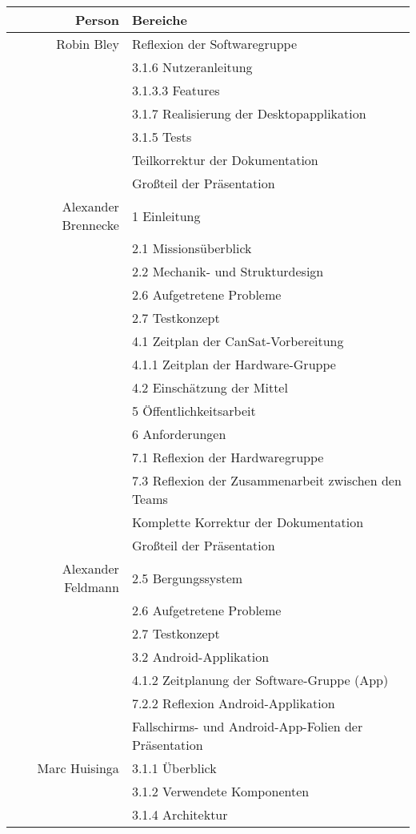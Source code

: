 \begin{table}[H]
	\centering
	\begin{tabular}{rl}
		\toprule
		\textbf{Person} & \textbf{Bereiche} \\
		\midrule
		Robin Bley & Reflexion der Softwaregruppe \\
		 & 3.1.6 Nutzeranleitung \\
		 & 3.1.3.3 Features \\
		 & 3.1.7 Realisierung der Desktopapplikation \\
		 & 3.1.5 Tests \\
		 & Teilkorrektur der Dokumentation \\
		 & Großteil der Präsentation \\
		Alexander Brennecke & 1 Einleitung  \\
		& 2.1 Missionsüberblick \\
		& 2.2 Mechanik- und Strukturdesign \\
		& 2.6 Aufgetretene Probleme \\
		& 2.7 Testkonzept \\
		& 4.1 Zeitplan der CanSat-Vorbereitung \\
		& 4.1.1 Zeitplan der Hardware-Gruppe \\
		& 4.2 Einschätzung der Mittel \\
		& 5 Öffentlichkeitsarbeit \\
		& 6 Anforderungen \\
		& 7.1 Reflexion der Hardwaregruppe \\
		& 7.3 Reflexion der Zusammenarbeit zwischen den Teams \\
		& Komplette Korrektur der Dokumentation \\
		& Großteil der Präsentation \\
		Alexander Feldmann & 2.5 Bergungssystem \\
		 & 2.6 Aufgetretene Probleme \\
		 & 2.7 Testkonzept \\
		 & 3.2 Android-Applikation \\
		 & 4.1.2 Zeitplanung der Software-Gruppe (App) \\
		 & 7.2.2 Reflexion Android-Applikation \\
		 & Fallschirms- und Android-App-Folien der Präsentation \\
		Marc Huisinga & 3.1.1 Überblick \\
		 & 3.1.2 Verwendete Komponenten \\
		 & 3.1.4 Architektur \\

\end{tabular}
\end{table}

